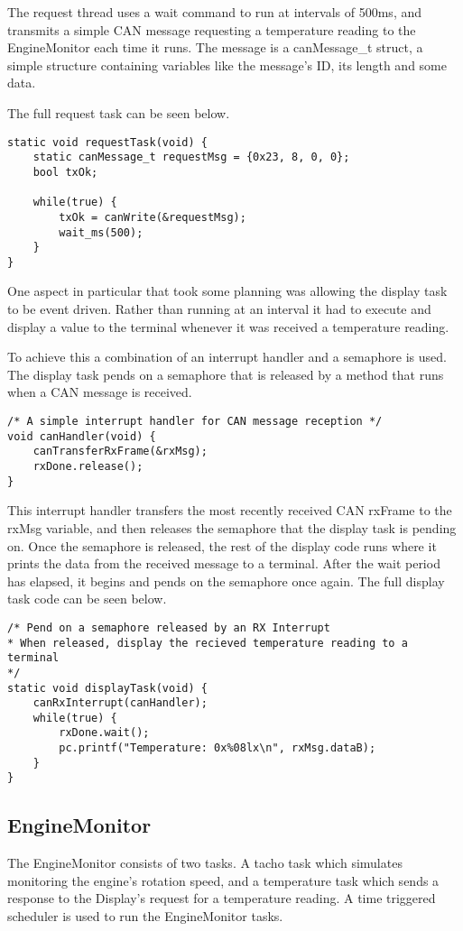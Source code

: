 \documentclass[]{report}
\begin{document}
			The request thread uses a wait command to run at intervals of 500ms, and transmits a simple CAN message requesting a temperature reading to the EngineMonitor each time it runs. The message is a canMessage\_t struct, a simple structure containing variables like the message's ID, its length and some data.
			
			The full request task can be seen below.
			
\begin{lstlisting}
static void requestTask(void) {
	static canMessage_t requestMsg = {0x23, 8, 0, 0};
	bool txOk;
				
	while(true) {
		txOk = canWrite(&requestMsg);
		wait_ms(500);
	}
}
\end{lstlisting}			
			One aspect in particular that took some planning was allowing the display task to be event driven. Rather than running at an interval it had to execute and display a value to the terminal whenever it was received a temperature reading.
			
			To achieve this a combination of an interrupt handler and a semaphore is used. The display task pends on a semaphore that is released by a method that runs when a CAN message is received.
			
\begin{lstlisting}
/* A simple interrupt handler for CAN message reception */
void canHandler(void) {
	canTransferRxFrame(&rxMsg);
	rxDone.release();
}
\end{lstlisting}

			This interrupt handler transfers the most recently received CAN rxFrame to the rxMsg variable, and then releases the semaphore that the display task is pending on. Once the semaphore is released, the rest of the display code runs where it prints the data from the received message to a terminal. After the wait period has elapsed, it begins and pends on the semaphore once again. The full display task code can be seen below.
			
\begin{lstlisting}
/* Pend on a semaphore released by an RX Interrupt
* When released, display the recieved temperature reading to a terminal
*/
static void displayTask(void) {
	canRxInterrupt(canHandler);
	while(true) {
		rxDone.wait();
		pc.printf("Temperature: 0x%08lx\n", rxMsg.dataB);
	}
}
\end{lstlisting}

			\subsection{EngineMonitor}
			The EngineMonitor consists of two tasks. A tacho task which simulates monitoring the engine's rotation speed, and a temperature task which sends a response to the Display's request for a temperature reading. A time triggered scheduler is used to run the EngineMonitor tasks. 
			
\end{document}
